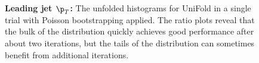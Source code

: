 \begin{figure}[]
\centering
\ContinuedFloat
{}\\
\\
\caption{\textbf{Leading jet $\p_T$:} The unfolded histograms for UniFold in a single trial with Poisson bootstrapping applied. The ratio plots reveal that the bulk of the distribution quickly achieves good performance after about two iterations, but the tails of the distribution can sometimes benefit from additional iterations.}
\label{fig:num_iterations:pT_ratios}
\end{figure}


